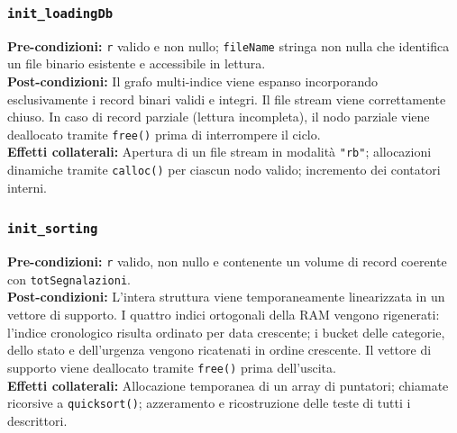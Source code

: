 \documentclass[12pt, a4paper]{article}
\begin{document}
\subsubsection{\texttt{init\_loadingDb}}
\vspace{3mm}
\begin{specbox}
\textbf{Pre-condizioni:} \texttt{r} valido e non nullo; \texttt{fileName} stringa non nulla che identifica un file binario esistente e accessibile in lettura. \\
\textbf{Post-condizioni:} Il grafo multi-indice viene espanso incorporando esclusivamente i record binari validi e integri. Il file stream viene correttamente chiuso. In caso di record parziale (lettura incompleta), il nodo parziale viene deallocato tramite \texttt{free()} prima di interrompere il ciclo. \\
\textbf{Effetti collaterali:} Apertura di un file stream in modalità \texttt{"rb"}; allocazioni dinamiche tramite \texttt{calloc()} per ciascun nodo valido; incremento dei contatori interni.
\end{specbox}

\subsubsection{\texttt{init\_sorting}}
\vspace{3mm}
\begin{specbox}
\textbf{Pre-condizioni:} \texttt{r} valido, non nullo e contenente un volume di record coerente con \texttt{totSegnalazioni}. \\
\textbf{Post-condizioni:} L'intera struttura viene temporaneamente linearizzata in un vettore di supporto. I quattro indici ortogonali della RAM vengono rigenerati: l'indice cronologico risulta ordinato per data crescente; i bucket delle categorie, dello stato e dell'urgenza vengono ricatenati in ordine crescente. Il vettore di supporto viene deallocato tramite \texttt{free()} prima dell'uscita. \\
\textbf{Effetti collaterali:} Allocazione temporanea di un array di puntatori; chiamate ricorsive a \texttt{quicksort()}; azzeramento e ricostruzione delle teste di tutti i descrittori.
\end{specbox}
\end{document}
